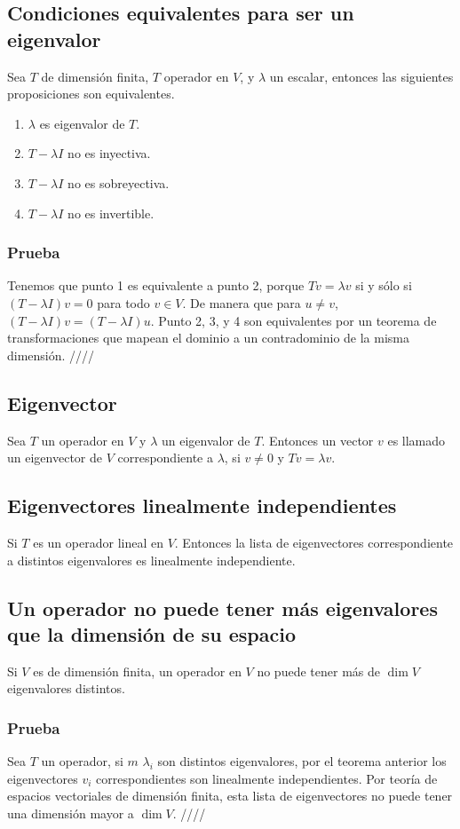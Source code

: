 \documentclass{article}
\begin{document}
\subsection{Condiciones equivalentes para ser un eigenvalor}
Sea $T$ de dimensión finita, $T$ operador en $V$, y
$\lambda$ un escalar, entonces las siguientes proposiciones
 son equivalentes.
 \begin{enumerate}
    \item $\lambda$ es eigenvalor de $T$.
    \item $T-\lambda I$ no es inyectiva.
    \item $T -\lambda I$ no es sobreyectiva.
    \item $T -\lambda I$ no es invertible.
 \end{enumerate}
 \subsubsection*{Prueba}
 Tenemos que punto 1 es equivalente a punto 2, porque
 $Tv=\lambda v$ si y sólo si $(T-\lambda I)v = 0$ para todo
 $v\in V$. De manera que para $u\neq v$, $(T-\lambda I)v =
 (T-\lambda I)u$. Punto 2, 3, y 4 son equivalentes por
 un teorema de transformaciones que mapean el dominio
 a un contradominio de la misma dimensión.
 \hfill ////

 \subsection{Eigenvector}
Sea $T$ un operador en $V$ y $\lambda$ un eigenvalor
de $T$. Entonces un vector $v$ es llamado un
eigenvector de $V$ correspondiente a $\lambda$, si
$v\neq 0$ y $Tv=\lambda v$.

\subsection{Eigenvectores linealmente independientes}
Si $T$ es un operador lineal en $V$. Entonces la lista
de eigenvectores correspondiente a distintos eigenvalores
es linealmente independiente.

\subsection{Un operador no puede tener más eigenvalores que la dimensión de su espacio}
Si $V$ es de dimensión finita, un operador en $V$ no puede
tener más de $\dim V$ eigenvalores distintos. 
\subsubsection*{Prueba}
Sea $T$ un operador, si $m$ $\lambda_i$ son distintos 
eigenvalores, por el teorema anterior los eigenvectores
$v_i$ correspondientes son linealmente independientes.
Por teoría de espacios vectoriales de dimensión finita,
esta lista de eigenvectores no puede tener una dimensión
mayor a $\dim V$. \hfill ////
\end{document}
